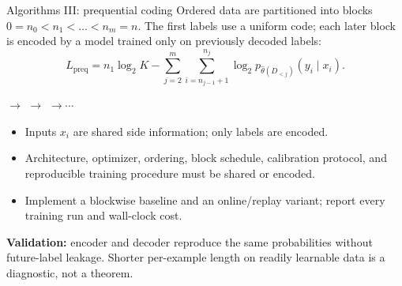 \documentclass[aspectratio=169,notheorems]{beamer}
\begin{document}
\begin{frame}[shrink=4]{Algorithms III: prequential coding}
\small
Ordered data are partitioned into blocks $0=n_0<n_1<\dots<n_m=n$. The first labels
use a uniform code; each later block is encoded by a model trained only on previously
decoded labels:
\[
L_{\mathrm{preq}}
=n_1\log_2 K
-\sum_{j=2}^{m}\sum_{i=n_{j-1}+1}^{n_j}
\log_2 p_{\widehat\theta(D_{<j})}(y_i\mid x_i).
\]

\begin{center}
$\longrightarrow$
$\longrightarrow$
$\longrightarrow\cdots$
\end{center}

\begin{itemize}\setlength{\itemsep}{0.34em}
  \item Inputs $x_i$ are shared side information; only labels are encoded.
  \item Architecture, optimizer, ordering, block schedule, calibration protocol, and
        reproducible training procedure must be shared or encoded.
  \item Implement a blockwise baseline and an online/replay variant; report every
        training run and wall-clock cost.
\end{itemize}

\textbf{Validation:} encoder and decoder reproduce the same probabilities without
future-label leakage. Shorter per-example length on readily learnable data is a
diagnostic, not a theorem.
\end{frame}
\end{document}
